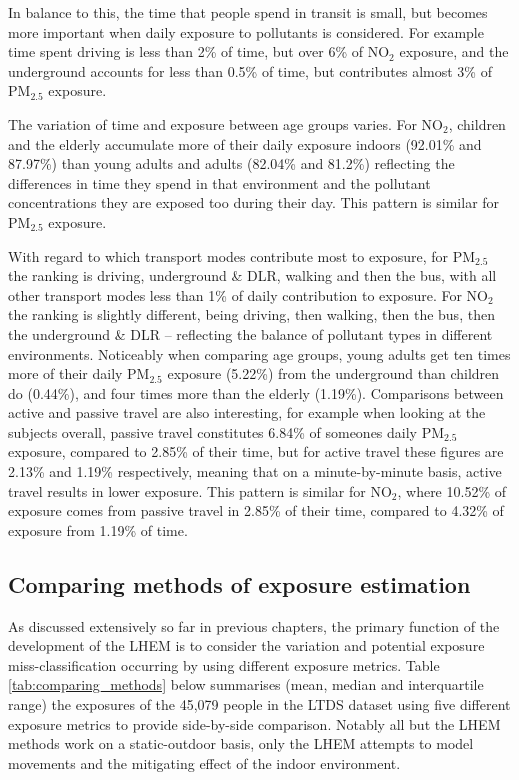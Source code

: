 In balance to this, the time that people spend in transit is small, but becomes more important when daily exposure to pollutants is considered. For example time spent driving is less than 2\% of time, but over 6\% of NO$_{2}$ exposure, and the underground accounts for less than 0.5\% of time, but contributes almost 3\% of PM$_{2.5}$ exposure.

The variation of time and exposure between age groups varies. For NO$_{2}$, children and the elderly accumulate more of their daily exposure indoors (92.01\% and 87.97\%) than young adults and adults (82.04\% and 81.2\%) reflecting the differences in time they spend in that environment and the pollutant concentrations they are exposed too during their day. This pattern is similar for PM$_{2.5}$ exposure.

With regard to which transport modes contribute most to exposure, for PM$_{2.5}$ the ranking is driving, underground \& DLR, walking and then the bus, with all other transport modes less than 1\% of daily contribution to exposure. For NO$_{2}$ the ranking is slightly different, being driving, then walking, then the bus, then the underground \& DLR -- reflecting the balance of pollutant types in different environments. Noticeably when comparing age groups, young adults get ten times more of their daily PM$_{2.5}$ exposure (5.22\%) from the underground than children do (0.44\%), and four times more than the elderly (1.19\%). Comparisons between active and passive travel are also interesting, for example when looking at the subjects overall, passive travel constitutes 6.84\% of someones daily PM$_{2.5}$ exposure, compared to 2.85\% of their time, but for active travel these figures are 2.13\% and 1.19\% respectively, meaning that on a minute-by-minute basis, active travel results in lower exposure. This pattern is similar for NO$_{2}$, where 10.52\% of exposure comes from passive travel in 2.85\% of their time, compared to 4.32\% of exposure from 1.19\% of time.

\subsection{Comparing methods of exposure estimation}
\label{subsec:comparing_exposure_methods}

As discussed extensively so far in previous chapters, the primary function of the development of the LHEM is to consider the variation and potential exposure miss-classification occurring by using different exposure metrics. Table \ref{tab:comparing_methods} below summarises (mean, median and interquartile range) the exposures of the 45,079 people in the LTDS dataset using five different exposure metrics to provide side-by-side comparison. Notably all but the LHEM methods work on a static-outdoor basis, only the LHEM attempts to model movements and the mitigating effect of the indoor environment.

